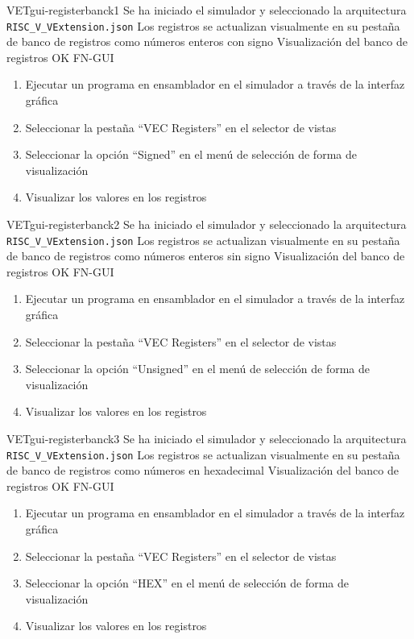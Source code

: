 \begin{testCase}{VET}{gui-registerbanck1}
    {Se ha iniciado el simulador y seleccionado la arquitectura \texttt{RISC\_V\_VExtension.json}}
    {Los registros se actualizan visualmente en su pestaña de banco de registros como números enteros con signo}
    {Visualización del banco de registros} %
    {OK} %
    {FN-GUI} %
    \begin{enumerate}
        \item Ejecutar un programa en ensamblador en el simulador a través de la interfaz gráfica
        \item Seleccionar la pestaña ``VEC Registers'' en el selector de vistas
        \item Seleccionar la opción ``Signed'' en el menú de selección de forma de visualización
        \item Visualizar los valores en los registros
    \end{enumerate}
\end{testCase}

\begin{testCase}{VET}{gui-registerbanck2}
    {Se ha iniciado el simulador y seleccionado la arquitectura \texttt{RISC\_V\_VExtension.json}}
    {Los registros se actualizan visualmente en su pestaña de banco de registros como números enteros sin signo}
    {Visualización del banco de registros} %
    {OK} %
    {FN-GUI}
    \begin{enumerate}
        \item Ejecutar un programa en ensamblador en el simulador a través de la interfaz gráfica
        \item Seleccionar la pestaña ``VEC Registers'' en el selector de vistas
        \item Seleccionar la opción ``Unsigned'' en el menú de selección de forma de visualización
        \item Visualizar los valores en los registros
    \end{enumerate}
\end{testCase}

\begin{testCase}{VET}{gui-registerbanck3}
    {Se ha iniciado el simulador y seleccionado la arquitectura \texttt{RISC\_V\_VExtension.json}}
    {Los registros se actualizan visualmente en su pestaña de banco de registros como números en hexadecimal}
    {Visualización del banco de registros} %
    {OK} %
    {FN-GUI}
    \begin{enumerate}
        \item Ejecutar un programa en ensamblador en el simulador a través de la interfaz gráfica
        \item Seleccionar la pestaña ``VEC Registers'' en el selector de vistas
        \item Seleccionar la opción ``HEX'' en el menú de selección de forma de visualización
        \item Visualizar los valores en los registros
    \end{enumerate}
\end{testCase}

